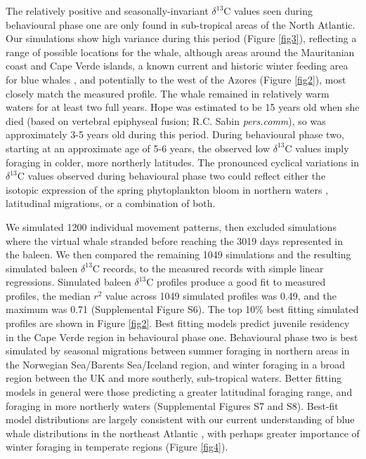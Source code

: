 \documentclass[a4paper,12pt]{article}
\begin{document}
The relatively positive and seasonally-invariant $\delta^{13}$C values seen during behavioural phase one are only found in sub-tropical areas of the North Atlantic.  
Our simulations show high variance during this period (Figure \ref{fig3}), reflecting a range of possible locations for the whale, although areas around the Mauritanian coast and Cape Verde islands, a known current and historic winter feeding area for blue whales  \cite{baines2014upwellings,reeves2004historical}, and potentially to the west of the Azores (Figure \ref{fig2}), most closely match the measured profile. 
The whale remained in relatively warm waters for at least two full years. 
Hope was estimated to be 15 years old when she died (based on vertebral epiphyseal fusion; R.C. Sabin \textit{pers.comm}), so was approximately 3-5 years old during this period.
During behavioural phase two, starting at an approximate age of 5-6 years, the observed low $\delta^{13}$C values imply foraging in colder, more northerly latitudes. 
The pronounced cyclical variations in $\delta^{13}$C values observed during behavioural phase two could reflect either the isotopic expression of the spring phytoplankton bloom in northern waters \cite{magozzi2017using}, latitudinal migrations, or a combination of both.  

We simulated 1200 individual movement patterns, then excluded simulations where the virtual whale stranded before reaching the 3019 days represented in the baleen.
We then compared the remaining 1049 simulations and the resulting simulated baleen $\delta^{13}$C records, to the measured records with simple linear regressions. 
Simulated baleen $\delta^{13}$C profiles produce a good fit to measured profiles, the median $r^2$ value across 1049 simulated profiles was 0.49, and the maximum was 0.71 (Supplemental Figure S6).
The top 10\% best fitting simulated profiles are shown in Figure \ref{fig2}. 
Best fitting models predict juvenile residency in the Cape Verde region in behavioural phase one. 
Behavioural phase two is best simulated by seasonal migrations between summer foraging in northern areas in the Norwegian Sea/Barents Sea/Iceland region, and winter foraging in a broad region between the UK and more southerly, sub-tropical waters. 
Better fitting models in general were those predicting a greater latitudinal foraging range, and foraging in more northerly waters (Supplemental Figures S7 and S8).
Best-fit model distributions are largely consistent with our current understanding of blue whale distributions in the northeast Atlantic \cite{reeves2004historical,baines2014upwellings,baines2017autumn,reeves2004historical}, with perhaps greater importance of winter foraging in temperate regions (Figure \ref{fig4}).
\end{document}
